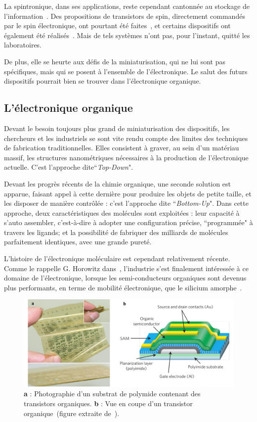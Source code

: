 La spintronique, dans ses applications, reste cependant cantonnée au stockage de  l'information~\cite{Awschalom2007}. Des propositions de transistors de spin, directement commandés par le spin électronique, ont pourtant été faites~\cite{Datta1990}, et certains dispositifs ont également été réalisés~\cite{Johnson1996,Huang2007}. Mais de tels systèmes n'ont pas, pour l'instant, quitté les laboratoires.

De plus, elle se heurte aux défis de la miniaturisation, qui ne lui sont pas spécifiques, mais qui se posent à l'ensemble de l'électronique. Le salut des futurs dispositifs pourrait bien se trouver dans l'électronique organique.

\subsection{L'électronique organique}
Devant le besoin toujours plus grand de miniaturisation des dispositifs, les chercheurs et les industriels se sont vite rendu compte des limites des techniques de fabrication traditionnelles. Elles consistent à graver, au sein d'un matériau massif, les structures nanométriques nécessaires à la production de l'électronique actuelle. C'est l'approche dite``\textit{Top-Down}".

Devant les progrès récents de la chimie organique, une seconde solution est apparue, faisant appel à cette dernière  pour produire les objets de petite taille, et les disposer de manière contrôlée : c'est l'approche dite ``\textit{Bottom-Up}". Dans cette approche, deux caractéristiques des molécules sont exploitées : leur capacité à s'auto assembler, c'est-à-dire à adopter une configuration précise, ``programmée" à travers les ligands; et la possibilité de fabriquer des milliards de molécules parfaitement identiques, avec une grande pureté. 

L'histoire de l'électronique moléculaire est cependant relativement récente. Comme le rappelle G. Horowitz dans~\cite{Klauk2007}, l'industrie s'est finalement intéressée à ce domaine de l'électronique, lorsque les semi-conducteurs organiques sont devenus plus performants, en terme de mobilité électronique, que le silicium amorphe~\cite{Lin1997}.
\begin{figure}
\centering \includegraphics[scale=0.45]{Spintronique/MolecularElec/MolecularElec.pdf}
\caption{\textbf{a} : Photographie d'un substrat de polymide contenant des transistors organiques. \textbf{b} : Vue en coupe d'un transistor organique~(figure extraite de~\cite{Sekitani2010}).}
\label{MolecularElec}
\end{figure}


